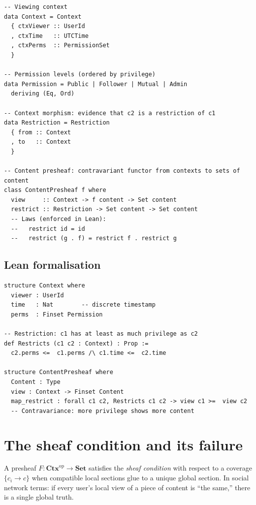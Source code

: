 \documentclass[11pt,a4paper]{article}
\theoremstyle{definition}
\theoremstyle{plain}
\theoremstyle{remark}
\newcommand{\Set}{\mathbf{Set}}
\newcommand{\op}{\mathrm{op}}
\newcommand{\Ctx}{\mathbf{Ctx}}
\begin{document}
\begin{lstlisting}[style=haskell]
-- Viewing context
data Context = Context
  { ctxViewer :: UserId
  , ctxTime   :: UTCTime
  , ctxPerms  :: PermissionSet
  }

-- Permission levels (ordered by privilege)
data Permission = Public | Follower | Mutual | Admin
  deriving (Eq, Ord)

-- Context morphism: evidence that c2 is a restriction of c1
data Restriction = Restriction
  { from :: Context
  , to   :: Context
  }

-- Content presheaf: contravariant functor from contexts to sets of content
class ContentPresheaf f where
  view     :: Context -> f content -> Set content
  restrict :: Restriction -> Set content -> Set content
  -- Laws (enforced in Lean):
  --   restrict id = id
  --   restrict (g . f) = restrict f . restrict g
\end{lstlisting}

\subsection{Lean formalisation}

\begin{lstlisting}[style=lean]
structure Context where
  viewer : UserId
  time   : Nat        -- discrete timestamp
  perms  : Finset Permission

-- Restriction: c1 has at least as much privilege as c2
def Restricts (c1 c2 : Context) : Prop :=
  c2.perms <=  c1.perms /\ c1.time <=  c2.time

structure ContentPresheaf where
  Content : Type
  view : Context -> Finset Content
  map_restrict : forall c1 c2, Restricts c1 c2 -> view c1 >=  view c2
  -- Contravariance: more privilege shows more content
\end{lstlisting}

\section{The sheaf condition and its failure}
\label{sec:sheaf}

A presheaf $F : \Ctx^\op \to \Set$ satisfies the \emph{sheaf
condition} with respect to a coverage $\{c_i \to c\}$ when compatible
local sections glue to a unique global section. In social network
terms: if every user's local view of a piece of content is
``the same,'' there is a single global truth.
\end{document}
